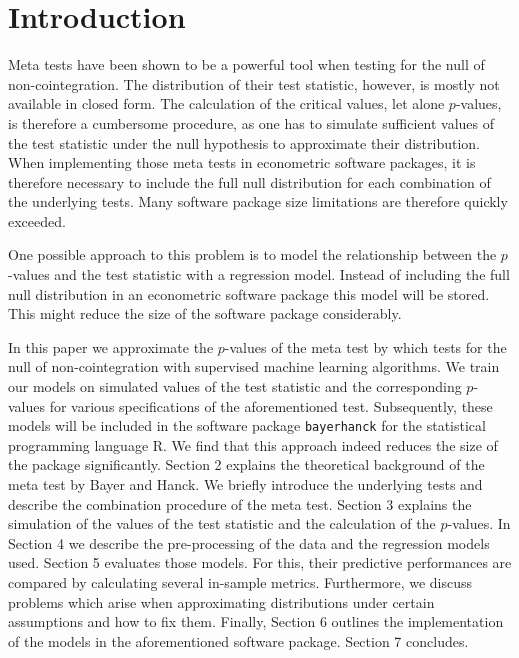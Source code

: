 \documentclass[12pt,a4paper]{article}
\begin{document}
\restoregeometry

\newpage
{} %

\hypertarget{introduction}{%
\section{Introduction}\label{introduction}}

Meta tests have been shown to be a powerful tool when testing for the
null of non-cointegration. The distribution of their test statistic,
however, is mostly not available in closed form. The calculation of the
critical values, let alone \(p\)-values, is therefore a cumbersome
procedure, as one has to simulate sufficient values of the test
statistic under the null hypothesis to approximate their distribution.
When implementing those meta tests in econometric software packages, it
is therefore necessary to include the full null distribution for each
combination of the underlying tests. Many software package size
limitations are therefore quickly exceeded.

One possible approach to this problem is to model the relationship
between the \(p\)-values and the test statistic with a regression model.
Instead of including the full null distribution in an econometric
software package this model will be stored. This might reduce the size
of the software package considerably.

In this paper we approximate the \(p\)-values of the meta test by
\textcite{Bayerhanck_2012} which tests for the null of non-cointegration
with supervised machine learning algorithms. We train our models on
simulated values of the test statistic and the corresponding
\(p\)-values for various specifications of the aforementioned test.
Subsequently, these models will be included in the software package
\texttt{bayerhanck} for the statistical programming language R. We find
that this approach indeed reduces the size of the package significantly.
Section 2 explains the theoretical background of the meta test by Bayer
and Hanck. We briefly introduce the underlying tests and describe the
combination procedure of the meta test. Section 3 explains the
simulation of the values of the test statistic and the calculation of
the \(p\)-values. In Section 4 we describe the pre-processing of the
data and the regression models used. Section 5 evaluates those models.
For this, their predictive performances are compared by calculating
several in-sample metrics. Furthermore, we discuss problems which arise
when approximating distributions under certain assumptions and how to
fix them. Finally, Section 6 outlines the implementation of the models
in the aforementioned software package. Section 7 concludes.
\end{document}
